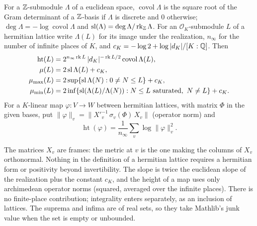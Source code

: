 \begin{definition}\label{geoa:slopes}
For a $\mathbb{Z}$-submodule $\Lambda$ of a euclidean space, $\operatorname{covol}\Lambda$ is the
square root of the Gram determinant of a $\mathbb{Z}$-basis if $\Lambda$ is discrete and $0$
otherwise; $\deg\Lambda=-\log\operatorname{covol}\Lambda$ and
$\operatorname{sl}(\Lambda)=\deg\Lambda/\operatorname{rk}_{\mathbb{Z}}\Lambda$. For an $\mathcal O_K$-submodule $L$
of a hermitian lattice write $\Lambda(L)$ for its image under the realization, $n_{\infty}$
for the number of infinite places of $K$, and $c_K=-\log2+\log|d_K|/[K:\mathbb{Q}]$. Then
\begin{align*}
\operatorname{ht}(L)&=2^{n_{\infty}\operatorname{rk} L}\,|d_K|^{-\operatorname{rk} L/2}\operatorname{covol}\Lambda(L),\\
\mu(L)&=2\operatorname{sl}\Lambda(L)+c_K,\\
\mu_{\max}(L)&=2\sup\{\operatorname{sl}\Lambda(N):0\ne N\le L\}+c_K,\\
\mu_{\min}(L)&=2\inf\{\operatorname{sl}(\Lambda(L)/\Lambda(N)):N\le L\text{ saturated},\ N\ne L\}+c_K.
\end{align*}
For a $K$-linear map $\varphi\colon V\to W$ between hermitian lattices, with matrix
$\Phi$ in the given bases, put
$\|\varphi\|_v=\|X'^{-1}_v\,\sigma_v(\Phi)\,X_v\|$ (operator norm) and
\[
\operatorname{ht}(\varphi)=\frac1{n_{\infty}}\sum_v\log\|\varphi\|_v^2 .
\]
\end{definition}

\begin{remark}[normalisations]\label{geoa:rem-normalisation}
The matrices $X_v$ are frames: the metric at $v$ is the one making the columns of $X_v$
orthonormal. Nothing in the definition of a hermitian lattice requires a hermitian form
or positivity beyond invertibility. The slope is twice the euclidean slope of the
realization plus the constant $c_K$, and the height of a map uses only archimedean
operator norms (squared, averaged over the infinite places). There is no finite-place
contribution; integrality enters separately, as an inclusion of lattices. The suprema
and infima are of real sets, so they take Mathlib's junk value when the set is empty or
unbounded.
\end{remark}

